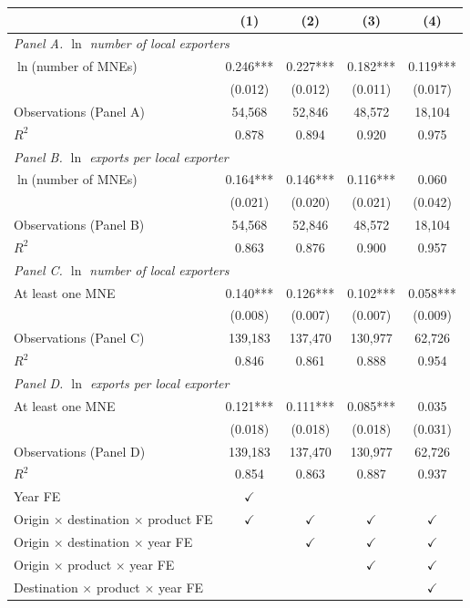 \begin{tabular}{l*{4}{c}}
\toprule
 & (1) & (2) & (3) & (4) \\
\midrule
\multicolumn{5}{l}{\textit{Panel A. $\ln$ number of local exporters}} \\
$\ln$(number of MNEs) & 0.246*** & 0.227*** & 0.182*** & 0.119*** \\
 & (0.012) & (0.012) & (0.011) & (0.017) \\
Observations (Panel A) & 54,568 & 52,846 & 48,572 & 18,104 \\
$R^2$ & 0.878 & 0.894 & 0.920 & 0.975 \\
\midrule
\multicolumn{5}{l}{\textit{Panel B. $\ln$ exports per local exporter}} \\
$\ln$(number of MNEs) & 0.164*** & 0.146*** & 0.116*** & 0.060 \\
 & (0.021) & (0.020) & (0.021) & (0.042) \\
Observations (Panel B) & 54,568 & 52,846 & 48,572 & 18,104 \\
$R^2$ & 0.863 & 0.876 & 0.900 & 0.957 \\
\midrule
\multicolumn{5}{l}{\textit{Panel C. $\ln$ number of local exporters}} \\
At least one MNE & 0.140*** & 0.126*** & 0.102*** & 0.058*** \\
 & (0.008) & (0.007) & (0.007) & (0.009) \\
Observations (Panel C) & 139,183 & 137,470 & 130,977 & 62,726 \\
$R^2$ & 0.846 & 0.861 & 0.888 & 0.954 \\
\midrule
\multicolumn{5}{l}{\textit{Panel D. $\ln$ exports per local exporter}} \\
At least one MNE & 0.121*** & 0.111*** & 0.085*** & 0.035 \\
 & (0.018) & (0.018) & (0.018) & (0.031) \\
Observations (Panel D) & 139,183 & 137,470 & 130,977 & 62,726 \\
$R^2$ & 0.854 & 0.863 & 0.887 & 0.937 \\
\midrule
Year FE & $\checkmark$ &  &  &  \\
Origin $\times$ destination $\times$ product FE & $\checkmark$ & $\checkmark$ & $\checkmark$ & $\checkmark$ \\
Origin $\times$ destination $\times$ year FE &  & $\checkmark$ & $\checkmark$ & $\checkmark$ \\
Origin $\times$ product $\times$ year FE &  &  & $\checkmark$ & $\checkmark$ \\
Destination $\times$ product $\times$ year FE &  &  &  & $\checkmark$ \\
\bottomrule
\end{tabular}
